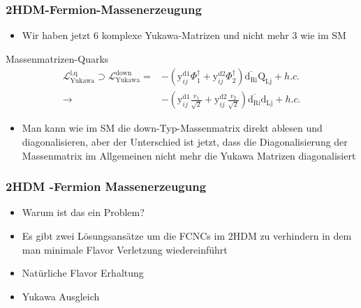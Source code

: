 \documentclass[xcolor=dvipsnames]{beamer}
\begin{document}
\begin{frame}
\frametitle{2HDM-Fermion-Massenerzeugung}
\begin{itemize}
\item Wir haben jetzt 6 komplexe Yukawa-Matrizen und nicht mehr 3 wie im SM 
\end{itemize}
\begin{block}{Massenmatrizen-Quarks }
\begin{equation*}
\begin{split}
\mathscr{L}_{\text{Yukawa}}^{\text{l,q}}\supset \mathscr{L}_{\text{Yukawa}}^{\text{down}} =&-(\text{y}^{\text{d1}}_{ij}\Phi_{1}^{\dagger}+\text{y}^{\text{d2}}_{ij}\Phi_{2}^{\dagger})\overline{\text{d}_{\text{Ri}}}\text{Q}_{\text{Lj}} +h.c. \\
\rightarrow &-(\text{y}^{\text{d1}}_{ij}\frac{v_{1}}{\sqrt{2}}+\text{y}^{\text{d2}}_{ij}\frac{v_{2}}{\sqrt{2}})\overline{\text{d}_{\text{Ri}}}\text{d}_{\text{Lj}} +h.c. 
\end{split}
\end{equation*}
\end{block}

\begin{itemize}
\item Man kann wie im SM die down-Typ-Massenmatrix direkt ablesen und diagonalisieren, aber der Unterschied ist jetzt, dass die Diagonalisierung der Massenmatrix  im Allgemeinen nicht mehr die Yukawa Matrizen diagonalisiert 
\end{itemize}
\end{frame}
\begin{frame}[t]
\frametitle{2HDM -Fermion Massenerzeugung}
\begin{itemize}

\item Warum ist das ein Problem?



\item Es gibt zwei Lösungsansätze um die FCNCs im 2HDM zu verhindern in dem man minimale Flavor Verletzung wiedereinführt
\item Natürliche Flavor Erhaltung
\item Yukawa Ausgleich 
\end{itemize}

\end{frame}
\end{document}
